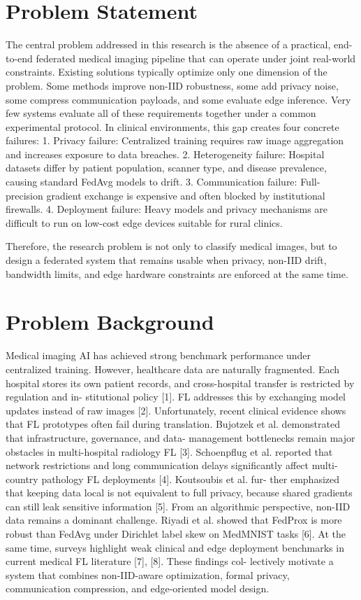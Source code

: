 \section{Problem Statement}
The central problem addressed in this research is the absence of a practical, end-to-end federated medical imaging pipeline that can operate under joint real-world constraints.
Existing solutions typically optimize only one dimension of the problem. Some methods improve non-IID robustness, some add privacy noise, some compress communication payloads, and some evaluate edge inference. Very few systems evaluate all of these requirements together under a common experimental protocol.
In clinical environments, this gap creates four concrete failures:
1. Privacy failure: Centralized training requires raw image aggregation and increases exposure to data breaches.
2. Heterogeneity failure: Hospital datasets differ by patient population, scanner type, and disease prevalence, causing standard FedAvg models to drift.
3. Communication failure: Full-precision gradient exchange is expensive and often blocked by institutional firewalls.
4. Deployment failure: Heavy models and privacy mechanisms are difficult to run on low-cost edge devices suitable for rural clinics.

Therefore, the research problem is not only to classify medical images, but to design a federated system that remains usable when privacy, non-IID drift, bandwidth limits, and edge hardware constraints are enforced at the same time.
\section{Problem Background}
Medical imaging AI has achieved strong benchmark performance under centralized training.
However, healthcare data are naturally fragmented.
Each hospital stores its own patient records, and cross-hospital transfer is restricted by regulation and in- stitutional policy [1]. FL addresses this by exchanging model updates instead of raw images [2].
Unfortunately, recent clinical evidence shows that FL prototypes often fail during translation. Bujotzek et al. demonstrated that infrastructure, governance, and data- management bottlenecks remain major obstacles in multi-hospital radiology FL [3].
Schoenpflug et al. reported that network restrictions and long communication delays significantly affect multi-country pathology FL deployments [4]. Koutsoubis et al. fur- ther emphasized that keeping data local is not equivalent to full privacy, because shared gradients can still leak sensitive information [5].
From an algorithmic perspective, non-IID data remains a dominant challenge. Riyadi et al. showed that FedProx is more robust than FedAvg under Dirichlet label skew on
MedMNIST tasks [6].
At the same time, surveys highlight weak clinical and edge deployment benchmarks in current medical FL literature [7], [8]. These findings col- lectively motivate a system that combines non-IID-aware optimization, formal privacy, communication compression, and edge-oriented model design.
